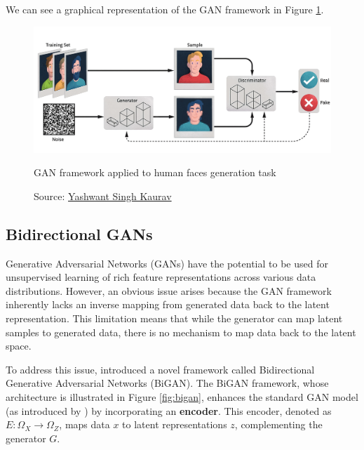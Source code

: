We can see a graphical representation of the GAN framework in Figure \ref{fig:gan}.
\begin{figure}[h]
    \centering
    \includegraphics[width=\textwidth]{figures/ch3/5.gan.png}
    \caption{GAN framework applied to human faces generation task}
    \vspace{-10px}
    \caption*{\scriptsize{Source: \href{https://www.linkedin.com/pulse/exploring-fascinating-realm-generative-adversarial-networks-kaurav/}{Yashwant Singh Kaurav}}}
    \label{fig:gan}
\end{figure}

\subsection{Bidirectional GANs}
\label{sec:bigan}

Generative Adversarial Networks (GANs) have the potential to be used
for unsupervised learning of rich feature representations across various
data distributions. However, an obvious issue arises because
the GAN framework inherently lacks an inverse mapping from generated data
back to the latent representation.
This limitation means that while the generator can map latent samples
to generated data, there is no mechanism to map data back to the latent space.

To address this issue, \cite{donahue2017} introduced a novel framework
called Bidirectional Generative Adversarial Networks (BiGAN).
The BiGAN framework, whose architecture is illustrated
in Figure \ref{fig:bigan}, enhances the standard GAN model
(as introduced by \cite{goodfellow2014}) by incorporating an \textbf{encoder}.
This encoder, denoted as \( E: \Omega_X \rightarrow \Omega_Z \),
maps data \( x \) to latent representations
\( z \), complementing the generator \( G \).

